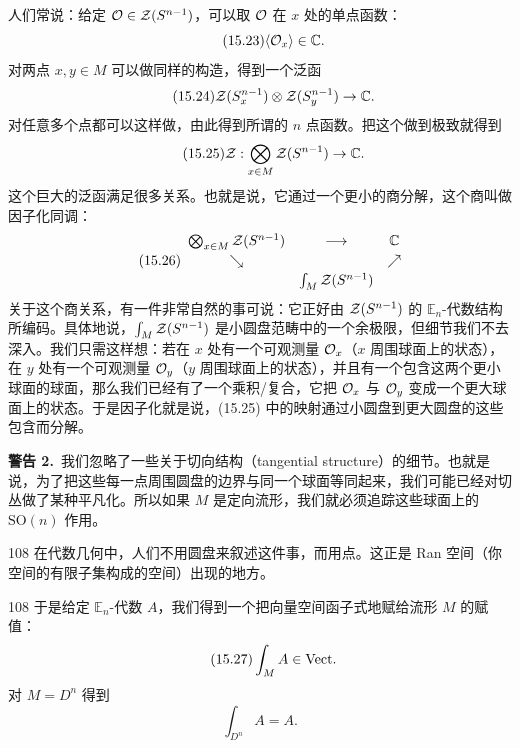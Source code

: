 人们常说：给定 $\mathcal{O}\in\mathcal{Z}(S^{n-1})$，可以取 $\mathcal{O}$ 在 $x$ 处的单点函数：
\begin{equation}\tag{15.23}
\langle \mathcal{O}_x\rangle\in\mathbb{C}.
\end{equation}
对两点 $x,y\in M$ 可以做同样的构造，得到一个泛函
\begin{equation}\tag{15.24}
\mathcal{Z}(S^{n-1}_x)\otimes\mathcal{Z}(S^{n-1}_y)\to\mathbb{C}.
\end{equation}
对任意多个点都可以这样做，由此得到所谓的 $n$ 点函数。把这个做到极致就得到
\begin{equation}\tag{15.25}
\mathcal{Z}:\bigotimes_{x\in M}\mathcal{Z}(S^{n-1})\to\mathbb{C}.
\end{equation}
这个巨大的泛函满足很多关系。也就是说，它通过一个更小的商分解，这个商叫做因子化同调：
\begin{equation}\tag{15.26}
\begin{array}{ccc}
\bigotimes_{x\in M}\mathcal{Z}(S^{n-1}) & \longrightarrow & \mathbb{C}\\[2pt]
\searrow & & \nearrow\\[2pt]
& \int_M\mathcal{Z}(S^{n-1}) &
\end{array}
\end{equation}
关于这个商关系，有一件非常自然的事可说：它正好由 $\mathcal{Z}(S^{n-1})$ 的 $\mathbb{E}_n$-代数结构所编码。具体地说，$\int_M\mathcal{Z}(S^{n-1})$ 是小圆盘范畴中的一个余极限，但细节我们不去深入。我们只需这样想：若在 $x$ 处有一个可观测量 $\mathcal{O}_x$（$x$ 周围球面上的状态），在 $y$ 处有一个可观测量 $\mathcal{O}_y$（$y$ 周围球面上的状态），并且有一个包含这两个更小球面的球面，那么我们已经有了一个乘积/复合，它把 $\mathcal{O}_x$ 与 $\mathcal{O}_y$ 变成一个更大球面上的状态。于是因子化就是说，(15.25) 中的映射通过小圆盘到更大圆盘的这些包含而分解。

\par\medskip\noindent\textbf{警告 2.}\ 我们忽略了一些关于切向结构（tangential structure）的细节。也就是说，为了把这些每一点周围圆盘的边界与同一个球面等同起来，我们可能已经对切丛做了某种平凡化。所以如果 $M$ 是定向流形，我们就必须追踪这些球面上的 $\mathrm{SO}(n)$ 作用。%

\begin{srcrem}{108}
在代数几何中，人们不用圆盘来叙述这件事，而用点。这正是 Ran 空间（你空间的有限子集构成的空间）出现的地方。
\end{srcrem}

\begin{srcex}{108}
于是给定 $\mathbb{E}_n$-代数 $A$，我们得到一个把向量空间函子式地赋给流形 $M$ 的赋值：
\begin{equation}\tag{15.27}
\int_M A\in\mathrm{Vect}.
\end{equation}
对 $M=D^n$ 得到
\begin{equation}\tag{15.28}
\int_{D^n}A=A.
\end{equation}
\end{srcex}

